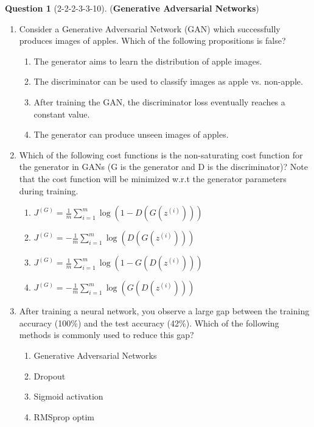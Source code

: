 \documentclass[12pt]{article}
\theoremstyle{definition}
\newtheorem{exercise}{Question}%
\begin{document}
\begin{exercise}[2-2-2-3-3-10] (\textbf{Generative Adversarial Networks})
\begin{enumerate}
    \item Consider a Generative Adversarial Network (GAN) which successfully produces images of apples. Which of the following propositions is false?
    \begin{enumerate}
        \item The generator aims to learn the distribution of apple images.
        \item The discriminator can be used to classify images as apple vs. non-apple.
        \item After training the GAN, the discriminator loss eventually reaches a constant value.
        \item The generator can produce unseen images of apples.
    \end{enumerate}

    \item Which of the following cost functions is the non-saturating cost function for the generator in GANs (G is the generator and D is the discriminator)? Note that the cost function will be minimized w.r.t the generator parameters during training.
    \begin{enumerate}
        \item $J^{(G)} = \frac{1}{m} \sum_{i=1}^{m} \log (1 - D(G(z^{(i)})))$
        \item $J^{(G)} = -\frac{1}{m} \sum_{i=1}^{m} \log (D(G(z^{(i)})))$
        \item $J^{(G)} = \frac{1}{m} \sum_{i=1}^{m} \log (1 - G(D(z^{(i)})))$
        \item $J^{(G)} = -\frac{1}{m} \sum_{i=1}^{m} \log (G(D(z^{(i)})))$
    \end{enumerate}

    \item After training a neural network, you observe a large gap between the training accuracy (100\%) and the test accuracy (42\%). Which of the following methods is commonly used to reduce this gap?
    \begin{enumerate}
        \item Generative Adversarial Networks
        \item Dropout
        \item Sigmoid activation
        \item RMSprop optim
    \end{enumerate}


\end{enumerate}
\end{exercise}
\end{document}
